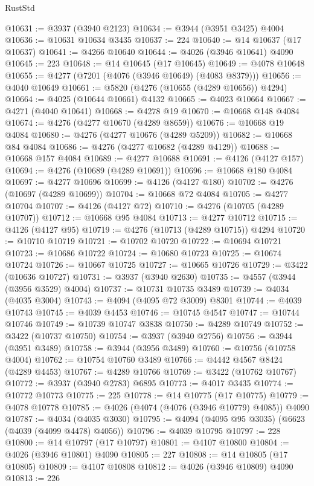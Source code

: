\begin{lexlean}{RustStd}
\begin{coremodule}
@10631 := @3937 (@3940 @2123)
@10634 := @3944 (@3951 @3425) @4004
@10636 := @10631 @10634 @3435
@10637 := 224
@10640 := @14 @10637 (@17 @10637)
@10641 := @4266 @10640
@10644 := @4026 (@3946 @10641) @4090
@10645 := 223
@10648 := @14 @10645 (@17 @10645)
@10649 := @4078 @10648
@10655 := @4277 (@7201 (@4076 (@3946 @10649) (@4083 @8379)))
@10656 := @4040 @10649
@10661 := @5820 (@4276 (@10655 (@4289 @10656)) @4294)
@10664 := @4025 (@10644 @10661) @4132
@10665 := @4023 @10664
@10667 := @4271 (@4040 @10641)
@10668 := @4278 @19
@10670 := @10668 @148 @4084
@10674 := @4276 (@4277 @10670 (@4289 @8659))
@10676 := @10668 @19 @4084
@10680 := @4276 (@4277 @10676 (@4289 @5209))
@10682 := @10668 @84 @4084
@10686 := @4276 (@4277 @10682 (@4289 @4129))
@10688 := @10668 @157 @4084
@10689 := @4277 @10688
@10691 := @4126 (@4127 @157)
@10694 := @4276 (@10689 (@4289 @10691))
@10696 := @10668 @180 @4084
@10697 := @4277 @10696
@10699 := @4126 (@4127 @180)
@10702 := @4276 (@10697 (@4289 @10699))
@10704 := @10668 @72 @4084
@10705 := @4277 @10704
@10707 := @4126 (@4127 @72)
@10710 := @4276 (@10705 (@4289 @10707))
@10712 := @10668 @95 @4084
@10713 := @4277 @10712
@10715 := @4126 (@4127 @95)
@10719 := @4276 (@10713 (@4289 @10715)) @4294
@10720 := @10710 @10719
@10721 := @10702 @10720
@10722 := @10694 @10721
@10723 := @10686 @10722
@10724 := @10680 @10723
@10725 := @10674 @10724
@10726 := @10667 @10725
@10727 := @10665 @10726
@10729 := @3422 (@10636 @10727)
@10731 := @3937 (@3940 @2630)
@10735 := @4557 (@3944 (@3956 @3529) @4004)
@10737 := @10731 @10735 @3489
@10739 := @4034 (@4035 @3004)
@10743 := @4094 (@4095 @72 @3009) @8301
@10744 := @4039 @10743
@10745 := @4039 @4453
@10746 := @10745 @4547
@10747 := @10744 @10746
@10749 := @10739 @10747 @3838
@10750 := @4289 @10749
@10752 := @3422 (@10737 @10750)
@10754 := @3937 (@3940 @2756)
@10756 := @3944 (@3951 @3489)
@10758 := @3944 (@3956 @3489)
@10760 := @10756 (@10758 @4004)
@10762 := @10754 @10760 @3489
@10766 := @4442 @4567 @8424 (@4289 @4453)
@10767 := @4289 @10766
@10769 := @3422 (@10762 @10767)
@10772 := @3937 (@3940 @2783) @6895
@10773 := @4017 @3435
@10774 := @10772 @10773
@10775 := 225
@10778 := @14 @10775 (@17 @10775)
@10779 := @4078 @10778
@10785 := @4026 (@4074 (@4076 (@3946 @10779) @4085)) @4090
@10787 := @4034 (@4035 @3030)
@10795 := @4094 (@4095 @95 @3035) (@6623 (@4039 (@4099 @4478) @4056))
@10796 := @4039 @10795
@10797 := 228
@10800 := @14 @10797 (@17 @10797)
@10801 := @4107 @10800
@10804 := @4026 (@3946 @10801) @4090
@10805 := 227
@10808 := @14 @10805 (@17 @10805)
@10809 := @4107 @10808
@10812 := @4026 (@3946 @10809) @4090
@10813 := 226

\end{coremodule}
\end{lexlean}
